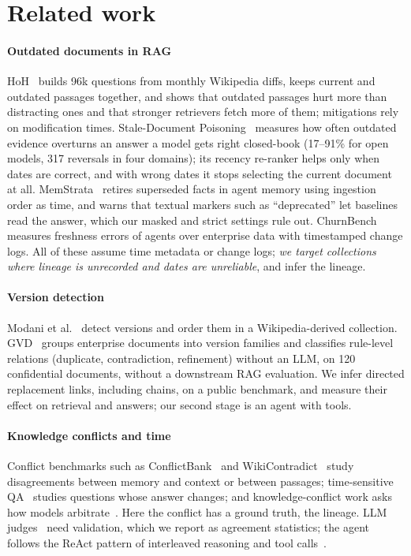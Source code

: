 \documentclass[11pt,a4paper]{article}
\begin{document}
\section{Related work}\label{sec:related}

\paragraph{Outdated documents in RAG} HoH~\cite{ouyang2025hoh} builds 96k
questions from monthly Wikipedia diffs, keeps current and outdated passages
together, and shows that outdated passages hurt more than distracting ones and
that stronger retrievers fetch more of them; mitigations rely on modification
times. Stale-Document Poisoning~\cite{ahmed2026poisoning} measures how often
outdated evidence overturns an answer a model gets right closed-book (17--91\% for
open models, 317 reversals in four domains); its recency re-ranker helps only when
dates are correct, and with wrong dates it stops selecting the current document
at all. MemStrata~\cite{memstrata2026} retires superseded facts in agent memory
using ingestion order as time, and warns that textual markers such as
``deprecated'' let baselines read the answer, which our masked and strict
settings rule out. ChurnBench~\cite{singh2026churnbench} measures freshness errors
of agents over enterprise data with timestamped change logs. All of these assume
time metadata or change logs; \emph{we target collections where lineage is
unrecorded and dates are unreliable}, and infer the lineage.

\paragraph{Version detection} Modani et al.~\cite{modani2021versions} detect
versions and order them in a Wikipedia-derived collection. GVD~\cite{sediqin2026gvd}
groups enterprise documents into version families and classifies rule-level
relations (duplicate, contradiction, refinement) without an LLM, on 120
confidential documents, without a downstream RAG evaluation. We infer directed
replacement links, including chains, on a public benchmark, and measure their
effect on retrieval and answers; our second stage is an agent with tools.

\paragraph{Knowledge conflicts and time} Conflict benchmarks such as
ConflictBank~\cite{su2024conflictbank} and WikiContradict~\cite{hou2024wikicontradict}
study disagreements between memory and context or between passages;
time-sensitive QA~\cite{chen2021timeqa,kasai2023realtimeqa,dhingra2022timeaware}
studies questions whose answer changes; and knowledge-conflict work asks how models
arbitrate~\cite{longpre2021entity,xie2024chameleon}. Here the conflict has a ground
truth, the lineage. LLM judges~\cite{zheng2023judge} need validation, which we
report as agreement statistics; the agent follows the ReAct pattern of interleaved
reasoning and tool calls~\cite{yao2023react}.
\end{document}
